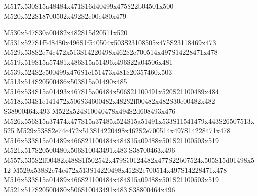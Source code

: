 \documentclass{article}
\begin{document}
\begin{multicols}{2}




\begin{center}
M517x530S15a48484x471S16d40499x475S22b04501x500 M520x522S18700502x492S2e00e480x479 
\end{center}




M530x547S30a00482x482S15d20511x520 M531x527S1f548480x496S1f540504x503S23108505x475S23118469x473 M529x538S2e74c472x513S14220498x462S2e700514x497S14228471x478 M519x519S15a57481x486S15a51496x496S22a04506x481 M539x524S2c500499x476S1c151473x481S20357460x503 M513x514S20500486x503S15a01490x485 M516x534S15a01493x467S15a06484x506S21100491x520S21100489x484 M518x534S1e141472x506S34600482x482S2ff00482x482S30e00482x482 S38900464x493 M522x524S10040478x494S2d608493x476 M526x556S15a37474x477S15a37485x524S15a51491x533S11541479x443S26507513x525 M529x538S2e74c472x513S14220498x462S2e700514x497S14228471x478 M516x533S15a01489x466S21100484x484S15a09488x501S21100503x519 M521x517S20500480x506S10043491x483 S38700463x496 M557x535S2ff00482x488S1f502542x479S30124482x477S22b07524x505S15d01498x512 M529x538S2e74c472x513S14220498x462S2e700514x497S14228471x478 M516x533S15a01489x466S21100484x484S15a09488x501S21100503x519 M521x517S20500480x506S10043491x483 S38800464x496




\end{multicols}
\end{document}
